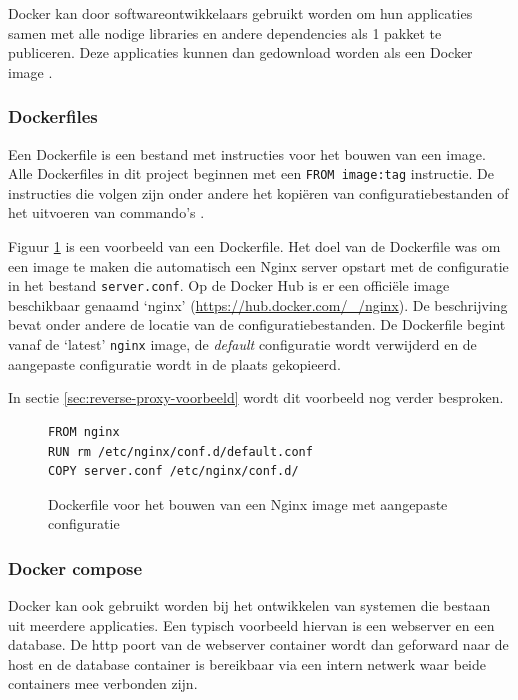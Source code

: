 \documentclass[a4paper, 12pt]{report}
\begin{document}
Docker kan door softwareontwikkelaars gebruikt worden om hun applicaties samen met alle nodige libraries en andere dependencies als 1 pakket te publiceren.
Deze applicaties kunnen dan gedownload worden als een Docker image \autocite{docker:containers}.

\subsubsection{Dockerfiles}
Een Dockerfile is een bestand met instructies voor het bouwen van een image.
Alle Dockerfiles in dit project beginnen met een \lstinline|FROM image:tag| instructie.
De instructies die volgen zijn onder andere het kopiëren van configuratiebestanden of het uitvoeren van commando's \autocite{docker:dockerfile}.

Figuur \ref{fig:dockerfile-example} is een voorbeeld van een Dockerfile.
Het doel van de Dockerfile was om een image te maken die automatisch een Nginx server opstart met de configuratie in het bestand \lstinline|server.conf|.
Op de Docker Hub is er een officiële image beschikbaar genaamd `nginx' (\url{https://hub.docker.com/_/nginx}).
De beschrijving bevat onder andere de locatie van de configuratiebestanden.
De Dockerfile begint vanaf de `latest' \lstinline|nginx| image, de \emph{default} configuratie wordt verwijderd en de aangepaste configuratie wordt in de plaats gekopieerd.

In sectie \ref{sec:reverse-proxy-voorbeeld} wordt dit voorbeeld nog verder besproken.

\begin{figure}[H]
  \begin{lstlisting}
FROM nginx
RUN rm /etc/nginx/conf.d/default.conf
COPY server.conf /etc/nginx/conf.d/
  \end{lstlisting}
  \caption{Dockerfile voor het bouwen van een Nginx image met aangepaste configuratie}
  \label{fig:dockerfile-example}
\end{figure}

\subsubsection{Docker compose}
Docker kan ook gebruikt worden bij het ontwikkelen van systemen die bestaan uit meerdere applicaties.
Een typisch voorbeeld hiervan is een webserver en een database.
De http poort van de webserver container wordt dan geforward naar de host en de database container is bereikbaar via een intern netwerk waar beide containers mee verbonden zijn.
\end{document}
